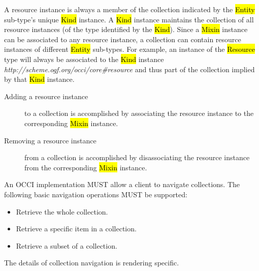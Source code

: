 \documentclass[10pt,a4paper]{article}
\begin{document}
A resource instance is always a member of the collection indicated by the
\hl{Entity} sub-type's unique \hl{Kind} instance. A \hl{Kind} instance maintains
the collection of all resource instances (of the type identified by the
\hl{Kind}).
%
Since a \hl{Mixin} instance can be associated to any resource instance, a
collection can contain resource instances of different \hl{Entity} sub-types.
%
For example, an instance of the \hl{Resource} type will always be associated
to the \hl{Kind} instance
\textit{http://scheme.ogf.org/occi/core\#resource} and thus part of the
collection implied by that \hl{Kind} instance.
\begin{description}
\item[Adding a resource instance] to a collection is accomplished by associating the
 resource instance to the corresponding \hl{Mixin} instance.
\item[Removing a resource instance] from a collection is accomplished by disassociating
 the resource instance from the corresponding \hl{Mixin} instance.
\end{description}
%
An OCCI implementation MUST allow a client to navigate collections. The
following basic navigation operations MUST be supported:
\begin{itemize}
\item Retrieve the whole collection.
\item Retrieve a specific item in a collection.
\item Retrieve a subset of a collection.
\end{itemize}
%
The details of collection navigation is rendering specific.
\end{document}
